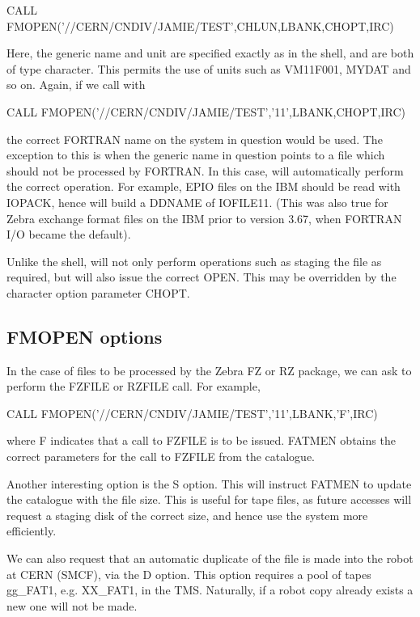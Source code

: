 \begin{XMP}
      CALL FMOPEN('//CERN/CNDIV/JAMIE/TEST',CHLUN,LBANK,CHOPT,IRC)
\end{XMP}
\par
Here, the generic name and unit are specified exactly as in the
shell, and are both of type character. This permits
the use of units such as VM11F001, MYDAT and so on. Again,
if we call  with
\begin{XMP}
      CALL FMOPEN('//CERN/CNDIV/JAMIE/TEST','11',LBANK,CHOPT,IRC)
\end{XMP}
the correct FORTRAN name on the system in question would be used.
The exception to this is when the generic name in question points
to a file which should not be processed by FORTRAN. In this case,
 will automatically perform the correct operation.
For example, EPIO files on the IBM should be read with IOPACK,
hence  will build a DDNAME of IOFILE11. (This was also
true for Zebra exchange format files on the IBM prior to
version 3.67, when FORTRAN I/O became the default).
\par
Unlike the shell,  will not only perform operations such
as staging the file as required, but will also issue
the correct OPEN. This may be overridden by the character
option parameter CHOPT.
\subsection{FMOPEN options}
\par
In the case of files to be processed by the Zebra FZ or RZ package,
we can ask  to perform the FZFILE or RZFILE call.
For example,
\begin{XMP}
      CALL FMOPEN('//CERN/CNDIV/JAMIE/TEST','11',LBANK,'F',IRC)
\end{XMP}
\par
where F indicates that a call to FZFILE is to be issued. FATMEN obtains
the correct parameters for the call to FZFILE from the catalogue.
\par
Another interesting option is the S option. This will instruct FATMEN
to update the catalogue with the file size. This is useful for tape
files, as future accesses will request a staging disk of the correct
size, and hence use the system more efficiently. 
\par
We can also request that an automatic duplicate of the file is made
into the robot at CERN (SMCF), via the D option. This option requires
a pool of tapes gg\_FAT1, e.g. XX\_FAT1, in the TMS. Naturally, if a robot
copy already exists a new one will not be made.
